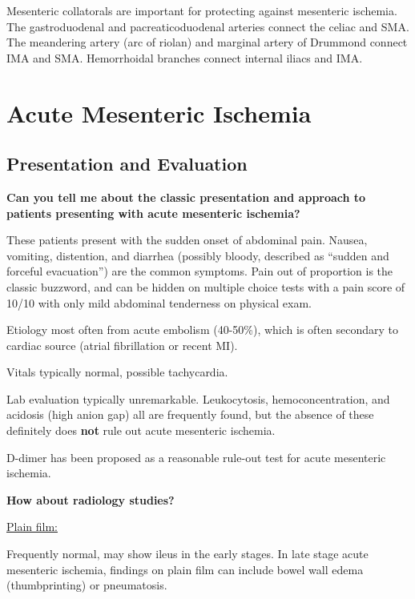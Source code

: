 \documentclass[
]{book}
\begin{document}
Mesenteric collatorals are important for protecting against mesenteric
ischemia. The gastroduodenal and pacreaticoduodenal arteries connect the
celiac and SMA. The meandering artery (arc of riolan) and marginal
artery of Drummond connect IMA and SMA. Hemorrhoidal branches connect
internal iliacs and IMA. \citep{chandraChronicMesentericIschemia2010, vangulikAnastomosisRiolanRevisited2005}

\hypertarget{acute-mesenteric-ischemia}{%
\section{Acute Mesenteric Ischemia}\label{acute-mesenteric-ischemia}}

\hypertarget{presentation-and-evaluation}{%
\subsection{Presentation and Evaluation}\label{presentation-and-evaluation}}

\textbf{Can you tell me about the classic presentation and approach to
patients presenting with acute mesenteric ischemia?}

These patients present with the sudden onset of abdominal pain. Nausea,
vomiting, distention, and diarrhea (possibly bloody, described as
``sudden and forceful evacuation'') are the common symptoms. Pain out of
proportion is the classic buzzword, and can be hidden on multiple choice
tests with a pain score of 10/10 with only mild abdominal tenderness on
physical exam.

Etiology most often from acute embolism (40-50\%), which is often
secondary to cardiac source (atrial fibrillation or recent
MI).\citep{wyersmarkcandmartin133AcuteMesenteric2019}

Vitals typically normal, possible tachycardia.

Lab evaluation typically unremarkable. Leukocytosis, hemoconcentration,
and acidosis (high anion gap) all are frequently found, but the absence
of these definitely does \textbf{not} rule out acute mesenteric ischemia.

D-dimer has been proposed as a reasonable rule-out test for acute
mesenteric ischemia.

\textbf{How about radiology studies?}

\uline{Plain film:}

Frequently normal, may show ileus in the early stages. In late stage
acute mesenteric ischemia, findings on plain film can include bowel wall
edema (thumbprinting) or pneumatosis.
\end{document}
